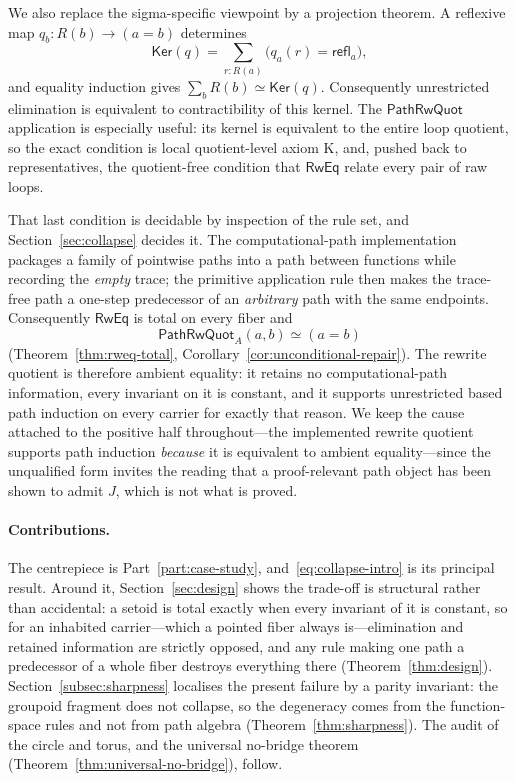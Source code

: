 \documentclass[10pt,reqno]{amsart}
\newcommand{\Eqv}{\simeq}
\newcommand{\refl}{\mathsf{refl}}
\newcommand{\Ker}{\mathsf{Ker}}
\newcommand{\PRW}{\mathsf{PathRwQuot}}
\begin{document}
We also replace the sigma-specific viewpoint by a projection theorem.  A
reflexive map \(q_b:R(b)\to(a=b)\) determines
\[
 \Ker(q)=\sum_{r:R(a)}\bigl(q_a(r)=\refl_a\bigr),
\tag{1.7}\label{eq:kernel-intro}
\]
and equality induction gives
\(\sum_bR(b)\Eqv\Ker(q)\).  Consequently unrestricted elimination is
equivalent to contractibility of this kernel.  The \(\PRW\) application is
especially useful: its kernel is equivalent to the entire loop quotient, so
the exact condition is local quotient-level axiom K, and, pushed back to
representatives, the quotient-free condition that \(\mathsf{RwEq}\) relate every
pair of raw loops.

That last condition is decidable by inspection of the rule set, and
Section~\ref{sec:collapse} decides it.  The computational-path implementation
packages a family of pointwise paths into a path between functions while
recording the \emph{empty} trace; the primitive application rule then makes the
trace-free path a one-step predecessor of an \emph{arbitrary} path with the same
endpoints.  Consequently \(\mathsf{RwEq}\) is total on every fiber and
\[
 \PRW_A(a,b)\Eqv(a=b)
\tag{1.8}\label{eq:collapse-intro}
\]
(Theorem~\ref{thm:rweq-total}, Corollary~\ref{cor:unconditional-repair}).  The
rewrite quotient is therefore ambient equality: it retains no
computational-path information, every invariant on it is constant, and it
supports unrestricted based path induction on every carrier for exactly that
reason.  We keep the cause attached to the positive half throughout---the
implemented rewrite quotient supports path induction \emph{because} it is
equivalent to ambient equality---since the unqualified form invites the reading
that a proof-relevant path object has been shown to admit \(J\), which is not
what is proved.

\paragraph{Contributions.}
The centrepiece is Part~\ref{part:case-study}, and~\eqref{eq:collapse-intro} is
its principal result.  Around it, Section~\ref{sec:design} shows the trade-off
is structural rather than accidental: a setoid is total exactly when every
invariant of it is constant, so for an inhabited carrier---which a pointed fiber
always is---elimination and retained information are strictly opposed, and any
rule making one path a predecessor of a whole fiber destroys everything there
(Theorem~\ref{thm:design}).  Section~\ref{subsec:sharpness} localises the
present failure by a parity invariant: the groupoid fragment does not collapse,
so the degeneracy comes from the function-space rules and not from path algebra
(Theorem~\ref{thm:sharpness}).  The audit of the circle and torus, and the
universal no-bridge theorem (Theorem~\ref{thm:universal-no-bridge}), follow.
\end{document}
